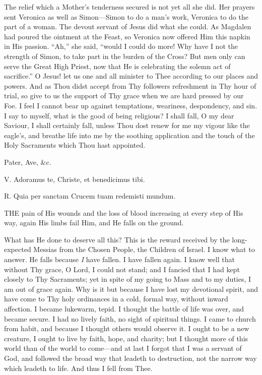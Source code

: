 The relief which a Mother's
tenderness secured is not yet all she did. Her prayers sent Veronica as
well as Simon—Simon to do a man's work, Veronica to do the part of a
woman. The devout servant of Jesus did what she could. As Magdalen had
poured the ointment at the Feast, so Veronica now offered Him this
napkin in His passion. ``Ah,'' she said, ``would I could do more! Why have
I not the strength of Simon, to take part in the burden of the Cross?
But men only can serve the Great High Priest, now that He is celebrating
the solemn act of sacrifice.'' O Jesus! let us one and all minister to
Thee according to our places and powers. And as Thou didst accept from
Thy followers refreshment in Thy hour of trial, so give to us the
support of Thy grace when we are hard pressed by our Foe. I feel I
cannot bear up against temptations, weariness, despondency, and sin. I
say to myself, what is the good of being religious? I shall fall,
O my dear Saviour, I shall certainly fall, unless Thou dost renew for me
my vigour like the eagle's, and breathe life into me by the soothing
application and the touch of the Holy Sacraments which Thou hast
appointed.

Pater, Ave, \&c.


V. Adoramus te, Christe, et
benedicimus tibi.

R. Quia per sanctam Crucem tuam redemisti mundum.

THE pain of His
wounds and the loss of blood increasing at every step of His way, again
His limbs fail Him, and He falls on the ground.

What has He done to deserve all
this? This is the reward received by the long-expected Messias from the
Chosen People, the Children of Israel. I know what to answer. He falls
because \emph{I} have fallen. I have fallen again. I know well that
without Thy grace, O Lord, I could not stand; and I fancied that I had
kept closely to Thy Sacraments; yet in spite of my going to Mass and to
my duties, I am out of grace again. Why is it but because I have lost my
devotional spirit, and have come to Thy holy ordinances in a cold,
formal way, without inward affection. I became lukewarm, tepid. I
thought the battle of life was over, and became secure. I had no lively
faith, no sight of spiritual things. I came to church from habit, and
because I thought others would observe it. I ought to be a new creature,
I ought to live by faith, hope, and charity; but I thought more of this
world than of the world to come—and at last I forgot that I was a
servant of God, and followed the broad way that leadeth to destruction,
not the narrow way which leadeth to life. And thus I fell from Thee.


